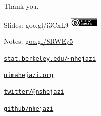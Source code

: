 \documentclass[12pt,t]{beamer}
\begin{document}
\begin{frame}[c]{Thank you.}

\Large
Slides: \href{https://goo.gl/i3CxL9}{goo.gl/i3CxL9} \quad
\includegraphics[height=5mm]{Figs/cc-zero.png}

\vspace{5mm}
Notes: \href{https://goo.gl/8RWEy5}{goo.gl/8RWEy5}

\vspace{5mm}
\href{https://www.stat.berkeley.edu/~nhejazi}{\tt stat.berkeley.edu/\textasciitilde{}nhejazi}

\vspace{5mm}
\href{http://nimahejazi.org}{\tt nimahejazi.org}

\vspace{5mm}
\href{https://twitter.com/nshejazi}{\tt twitter/@nshejazi}

\vspace{5mm}
\href{https://github.com/nhejazi}{\tt github/nhejazi}


\end{frame}

\end{document}
